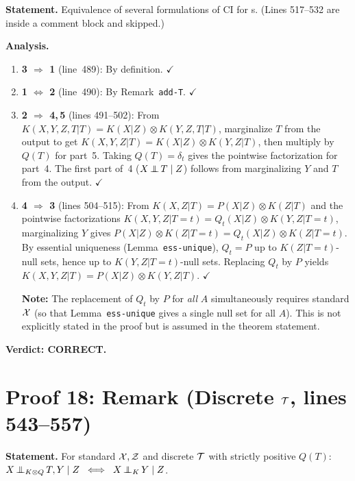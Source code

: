 \documentclass{article}
\begin{document}
\textbf{Statement.} Equivalence of several formulations of CI for \trv{}s.
(Lines 517--532 are inside a comment block and skipped.)

\textbf{Analysis.}
\begin{enumerate}[leftmargin=*]
  \item \textbf{3 $\Rightarrow$ 1} (line~489): By definition.  $\checkmark$
  \item \textbf{1 $\Leftrightarrow$ 2} (line~490): By Remark~\texttt{add-T}.  $\checkmark$
  \item \textbf{2 $\Rightarrow$ 4,\,5} (lines 491--502):
    From $K(X,Y,Z,T|T)=K(X|Z)\otimes K(Y,Z,T|T)$, marginalize $T$ from the
    output to get $K(X,Y,Z|T)=K(X|Z)\otimes K(Y,Z|T)$, then multiply by $Q(T)$
    for part~5.  Taking $Q(T)=\delta_t$ gives the pointwise factorization for
    part~4.  The first part of~4 ($X\operatorname*{\perp\mkern-11mu\perp} T\mid Z$) follows from marginalizing
    $Y$ and $T$ from the output.  $\checkmark$

  \item \textbf{4 $\Rightarrow$ 3} (lines 504--515):
    From $K(X,Z|T)=P(X|Z)\otimes K(Z|T)$ and the pointwise factorizations
    $K(X,Y,Z|T=t)=Q_t(X|Z)\otimes K(Y,Z|T=t)$, marginalizing $Y$ gives
    $P(X|Z)\otimes K(Z|T=t)=Q_t(X|Z)\otimes K(Z|T=t)$.
    By essential uniqueness (Lemma~\texttt{ess-unique}), $Q_t=P$ up to
    $K(Z|T=t)$-null sets, hence up to $K(Y,Z|T=t)$-null sets.  Replacing
    $Q_t$ by $P$ yields $K(X,Y,Z|T)=P(X|Z)\otimes K(Y,Z|T)$.  $\checkmark$

    \textbf{Note:} The replacement of $Q_t$ by $P$ for \emph{all} $A$
    simultaneously requires standard $\mathcal{X}$ (so that Lemma~\texttt{ess-unique}
    gives a single null set for all $A$).  This is not explicitly stated
    in the proof but is assumed in the theorem statement.
\end{enumerate}

\textbf{Verdict: CORRECT.}

\section{Proof 18: Remark (Discrete $\mathcal{T}$, lines 543--557)}

\textbf{Statement.} For standard $\mathcal{X},\mathcal{Z}$ and discrete $\mathcal{T}$ with strictly positive $Q(T)$:
$X\operatorname*{\perp\mkern-11mu\perp}_{K\otimes Q} T,Y\mid Z \;\iff\; X\operatorname*{\perp\mkern-11mu\perp}_K Y\mid Z$.
\end{document}
